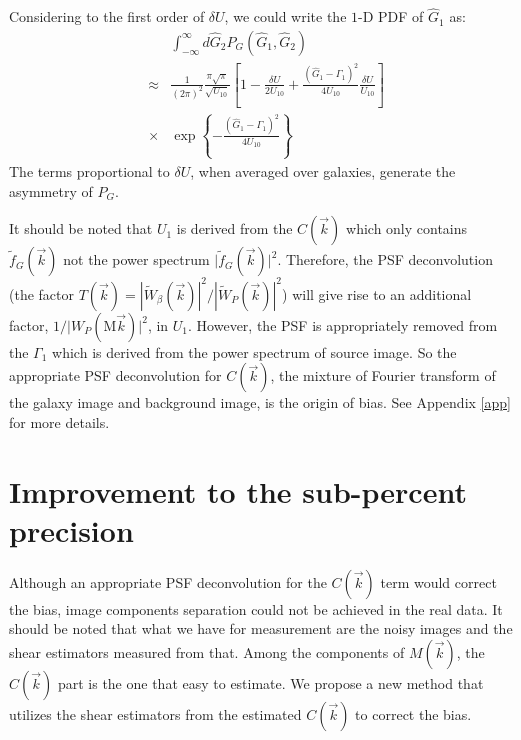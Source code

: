 \documentclass[twocolumn]{aastex62}
\begin{document}
Considering to the first order of $\delta U$, we could write the $1$-D PDF of $\hat{G}_1$ as:
\begin{eqnarray}
\label{1d_PDF}
&&\int_{-\infty}^{\infty}d\hat{G}_2 P_G\left(\hat{G}_1,\hat{G}_2\right)\\ \nonumber
&\approx&\frac{1}{(2\pi)^2}\frac{\pi\sqrt{\pi}}{\sqrt{U_{10}}}\left[1-\frac{\delta U}{2U_{10}}+\frac{\left(\hat{G}_1-\Gamma_1\right)^2}{4U_{10}}\frac{\delta U}{U_{10}}\right] \\ \nonumber &\times&\exp\left\{-\frac{\left(\hat{G}_1-\Gamma_1\right)^2}{4U_{10}}\right\}
\end{eqnarray}
The terms proportional to $\delta U$, when averaged over galaxies, generate the asymmetry of $P_G$. 

It should be noted that $U_1$ is derived from the $C(\vec{k})$ which only contains $\widetilde{f}_G(\vec{k})$ not the power spectrum $\vert\widetilde{f}_G(\vec{k})\vert^2$. Therefore, the PSF deconvolution (the factor $T(\vec{k}) = |\widetilde{W}_{\beta}(\vec{k})|^2/|\widetilde{W}_{P}(\vec{k})|^2$) will give rise to an additional factor, $1/\vert W_{P}(\mathrm{M}\vec{k})\vert^2$, in $U_1$. However, the PSF is appropriately removed from the $\Gamma_1$ which is derived from the power spectrum of source image. So the appropriate PSF deconvolution for $C(\vec{k})$, the mixture of Fourier transform of the galaxy image and background image, is the origin of bias. See Appendix \ref{app} for more details.








\section{Improvement to the sub-percent precision}\label{sec:bias_corr}
Although an appropriate PSF deconvolution for the $C(\vec{k})$ term would correct the bias, image components separation could not be achieved in the real data. It should be noted that what we have for measurement are the noisy images and the shear estimators measured from that. Among the components of $M(\vec{k})$, the $C(\vec{k})$ part is the one that easy to estimate. We propose a new method that utilizes the shear estimators from the estimated $C(\vec{k})$ to correct the bias. 
\end{document}
